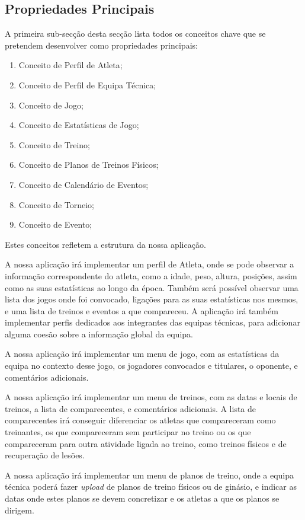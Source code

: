 \subsection{Propriedades Principais} \label{sec221}
A primeira sub-secção desta secção lista todos os conceitos chave que se pretendem desenvolver como propriedades principais:
\begin{enumerate}
	\item Conceito de Perfil de Atleta;
	\item Conceito de Perfil de Equipa Técnica;
	\item Conceito de Jogo;
	\item Conceito de Estatísticas de Jogo;
	\item Conceito de Treino;
	\item Conceito de Planos de Treinos Físicos;
	\item Conceito de Calendário de Eventos;
	\item Conceito de Torneio;
	\item Conceito de Evento;
\end{enumerate}

Estes conceitos refletem a estrutura da nossa aplicação. 

A nossa aplicação irá implementar um perfil de Atleta, onde se pode observar a informação correspondente do atleta, como a idade, peso, altura, posições, assim como as suas estatísticas ao longo da época. Também será possível observar uma lista dos jogos onde foi convocado, ligações para as suas estatísticas nos mesmos, e uma lista de treinos e eventos a que compareceu. A aplicação irá também implementar perfis dedicados aos integrantes das equipas técnicas, para adicionar alguma coesão sobre a informação global da equipa.

A nossa aplicação irá implementar um menu de jogo, com as estatísticas da equipa no contexto desse jogo, os jogadores convocados e titulares, o oponente, e comentários adicionais.

A nossa aplicação irá implementar um menu de treinos, com as datas e locais de treinos, a lista de comparecentes, e comentários adicionais. A lista de comparecentes irá conseguir diferenciar os atletas que compareceram como treinantes, os que compareceram sem participar no treino ou os que compareceram para outra atividade ligada ao treino, como treinos físicos e de recuperação de lesões.

A nossa aplicação irá implementar um menu de planos de treino, onde a equipa técnica poderá fazer \emph{upload} de planos de treino físicos ou de ginásio, e indicar as datas onde estes planos se devem concretizar e os atletas a que os planos se dirigem.

